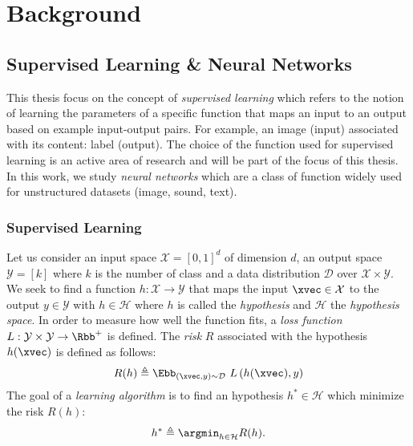 \chapter{Background}
\label{chapter:background}
\localtableofcontents

\section{Supervised Learning \& Neural Networks}
\label{secction:ch2-supervised_learning_neural_networks}

This thesis focus on the concept of \emph{supervised learning} which refers to the notion of learning the parameters of a specific function that maps an input to an output based on example input-output pairs.
For example, an image (input) associated with its content: label (output).
The choice of the function used for supervised learning is an active area of research and will be part of the focus of this thesis.
In this work, we study \emph{neural networks} which are a class of function widely used for unstructured datasets (image, sound, text).

\subsection{Supervised Learning}
\label{subsection:ch2-supervised_learning}

Let us consider an input space $\mathcal{X} = [0, 1]^d$ of dimension $d$, an output space $\mathcal{Y} = [k]$ where $k$ is the number of class and a data distribution $\mathcal{D}$ over $\mathcal{X} \times \mathcal{Y}$.
We seek to find a function $h: \mathcal{X} \rightarrow \mathcal{Y}$ that maps the input $\xvec \in \mathcal{X}$ to the output $y \in \mathcal{Y}$ with $h \in \mathcal{H}$ where $h$ is called the \emph{hypothesis} and $\mathcal{H}$ the \emph{hypothesis space}.
In order to measure how well the function fits, a \emph{loss function} $L: \mathcal{Y} \times \mathcal{Y} \rightarrow \Rbb^{+}$ is defined.
The \emph{risk} $R$ associated with the hypothesis $h(\xvec)$ is defined as follows:
\begin{equation}
  R(h) \triangleq \Ebb_{(\xvec, y) \sim \mathcal{D}}\  L \left( h(\xvec), y \right)
\end{equation}
The goal of a \emph{learning algorithm} is to find an hypothesis $h^* \in \mathcal{H}$ which minimize the risk $R(h)$:
\begin{equation}
  h^* \triangleq \argmin_{h \in \mathcal{H}} R(h) .
\end{equation}


